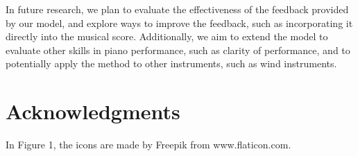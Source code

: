 \documentclass[manuscript,review,anonymous]{acmart}
\begin{document}
In future research, we plan to evaluate the effectiveness of the feedback provided by our model, and explore ways to improve the feedback, such as incorporating it directly into the musical score. 
Additionally, we aim to extend the model to evaluate other skills in piano performance, such as clarity of performance, and to potentially apply the method to other instruments, such as wind instruments.


\section{Acknowledgments}
In Figure 1, the icons are made by Freepik from www.flaticon.com.




\end{document}
